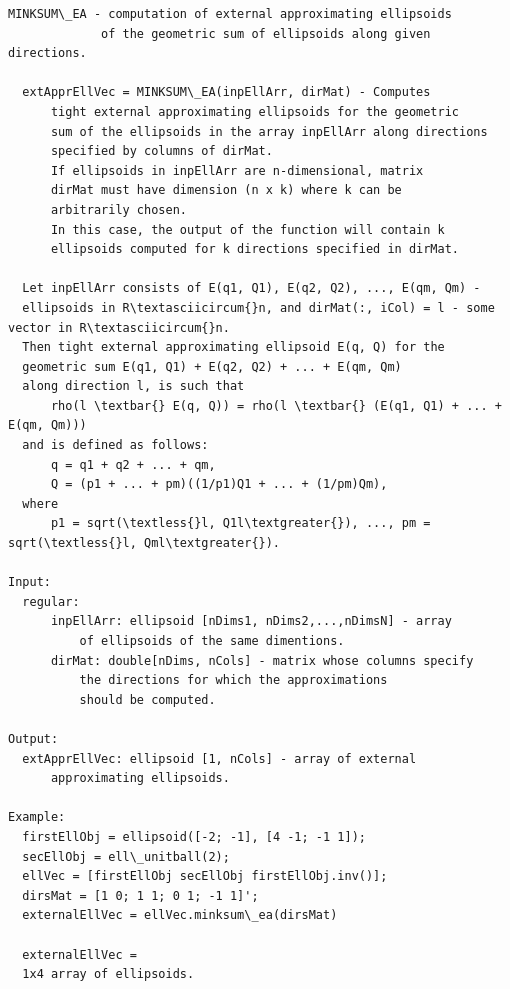 \documentclass[letterpaper,10pt,english]{sphinxmanual}
\begin{document}
\begin{Verbatim}[commandchars=\\\{\}]
MINKSUM\_EA - computation of external approximating ellipsoids
             of the geometric sum of ellipsoids along given directions.

  extApprEllVec = MINKSUM\_EA(inpEllArr, dirMat) - Computes
      tight external approximating ellipsoids for the geometric
      sum of the ellipsoids in the array inpEllArr along directions
      specified by columns of dirMat.
      If ellipsoids in inpEllArr are n-dimensional, matrix
      dirMat must have dimension (n x k) where k can be
      arbitrarily chosen.
      In this case, the output of the function will contain k
      ellipsoids computed for k directions specified in dirMat.

  Let inpEllArr consists of E(q1, Q1), E(q2, Q2), ..., E(qm, Qm) -
  ellipsoids in R\textasciicircum{}n, and dirMat(:, iCol) = l - some vector in R\textasciicircum{}n.
  Then tight external approximating ellipsoid E(q, Q) for the
  geometric sum E(q1, Q1) + E(q2, Q2) + ... + E(qm, Qm)
  along direction l, is such that
      rho(l \textbar{} E(q, Q)) = rho(l \textbar{} (E(q1, Q1) + ... + E(qm, Qm)))
  and is defined as follows:
      q = q1 + q2 + ... + qm,
      Q = (p1 + ... + pm)((1/p1)Q1 + ... + (1/pm)Qm),
  where
      p1 = sqrt(\textless{}l, Q1l\textgreater{}), ..., pm = sqrt(\textless{}l, Qml\textgreater{}).

Input:
  regular:
      inpEllArr: ellipsoid [nDims1, nDims2,...,nDimsN] - array
          of ellipsoids of the same dimentions.
      dirMat: double[nDims, nCols] - matrix whose columns specify
          the directions for which the approximations
          should be computed.

Output:
  extApprEllVec: ellipsoid [1, nCols] - array of external
      approximating ellipsoids.

Example:
  firstEllObj = ellipsoid([-2; -1], [4 -1; -1 1]);
  secEllObj = ell\_unitball(2);
  ellVec = [firstEllObj secEllObj firstEllObj.inv()];
  dirsMat = [1 0; 1 1; 0 1; -1 1]';
  externalEllVec = ellVec.minksum\_ea(dirsMat)

  externalEllVec =
  1x4 array of ellipsoids.
\end{Verbatim}
\end{document}
